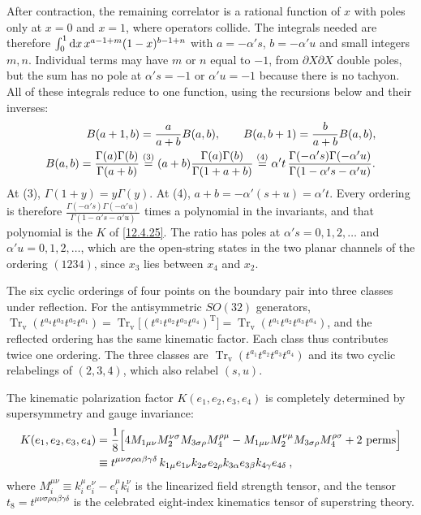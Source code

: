 \begin{tcolorbox}[breakable]
\begin{remark}
		After contraction, the remaining correlator is a rational function of $x$ with poles only at $x=0$ and $x=1$, where operators collide. The integrals needed are therefore $\int_{0}^{1}\mathrm{d} x\,x^{a-1+m}(1-x)^{b-1+n}$ with $a=-\alpha's$, $b=-\alpha'u$ and small integers $m,n$. Individual terms may have $m$ or $n$ equal to $-1$, from $\partial X\partial X$ double poles, but the sum has no pole at $\alpha's=-1$ or $\alpha'u=-1$ because there is no tachyon. All of these integrals reduce to one function, using the recursions below and their inverses:
		\begin{align*}
			B(a+1,b)&=\frac{a}{a+b}B(a,b),\qquad B(a,b+1)=\frac{b}{a+b}B(a,b),\\
			B(a,b)=\frac{\Gamma(a)\Gamma(b)}{\Gamma(a+b)}
			&\overset{(3)}{=} (a+b)\frac{\Gamma(a)\Gamma(b)}{\Gamma(1+a+b)}
			\overset{(4)}{=} \alpha't\,\frac{\Gamma(-\alpha's)\Gamma(-\alpha'u)}{\Gamma(1-\alpha's-\alpha'u)} .
		\end{align*}
		At (3), $\Gamma(1+y)=y\Gamma(y)$. At (4), $a+b=-\alpha'(s+u)=\alpha't$. Every ordering is therefore $\frac{\Gamma(-\alpha's)\Gamma(-\alpha'u)}{\Gamma(1-\alpha's-\alpha'u)}$ times a polynomial in the invariants, and that polynomial is the $K$ of \eqref{12.4.25}. The ratio has poles at $\alpha's=0,1,2,\dots$ and $\alpha'u=0,1,2,\dots$, which are the open-string states in the two planar channels of the ordering $(1234)$, since $x_{3}$ lies between $x_{4}$ and $x_{2}$.

		The six cyclic orderings of four points on the boundary pair into three classes under reflection. For the antisymmetric $SO(32)$ generators, $\operatorname{Tr}_{\mathrm{v}}(t^{a_4}t^{a_3}t^{a_2}t^{a_1})=\operatorname{Tr}_{\mathrm{v}}\bigl[(t^{a_1}t^{a_2}t^{a_3}t^{a_4})^{\mathrm{T}}\bigr]=\operatorname{Tr}_{\mathrm{v}}(t^{a_1}t^{a_2}t^{a_3}t^{a_4})$, and the reflected ordering has the same kinematic factor. Each class thus contributes twice one ordering. The three classes are $\operatorname{Tr}_{\mathrm{v}}(t^{a_1}t^{a_2}t^{a_3}t^{a_4})$ and its two cyclic relabelings of $(2,3,4)$, which also relabel $(s,u)$.
	\end{remark}
\end{tcolorbox}

\noindent The kinematic polarization factor $K(e_{1},e_{2},e_{3},e_{4})$ is completely determined by supersymmetry and gauge invariance:
\begin{align}
	K(e_{1},e_{2},e_{3},e_{4}) &= \frac{1}{8}\Bigl[4M_{1\mu\nu}M_{2}^{\nu\sigma}M_{3\sigma\rho}M_{4}^{\rho\mu} - M_{1\mu\nu}M_{2}^{\nu\mu}M_{3\sigma\rho}M_{4}^{\rho\sigma} + 2\text{ perms}\Bigr] \nonumber \\
	&\equiv t^{\mu\nu\sigma\rho\alpha\beta\gamma\delta}\,k_{1\mu}e_{1\nu}k_{2\sigma}e_{2\rho}k_{3\alpha}e_{3\beta}k_{4\gamma}e_{4\delta} \:, \label{12.4.25}
\end{align}
where $M_{i}^{\mu\nu} \equiv k_{i}^{\mu}e_{i}^{\nu} - e_{i}^{\mu}k_{i}^{\nu}$ is the linearized field strength tensor, and the tensor $t_{8} = t^{\mu\nu\sigma\rho\alpha\beta\gamma\delta}$ is the celebrated eight-index kinematics tensor of superstring theory.

